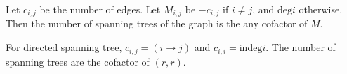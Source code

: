 Let $c_{i, j}$ be the number of edges. Let $M_{i, j}$ be $-c_{i, j}$ if $i \neq j$, and $\mathrm{deg} i$ otherwise.
Then the number of spanning trees of the graph is the any cofactor of $M$.

For directed spanning tree, $c_{i, j} = (i \rightarrow j)$ and $c_{i, i} = \mathrm{indeg} i$.
The number of spanning trees are the cofactor of $(r, r)$.